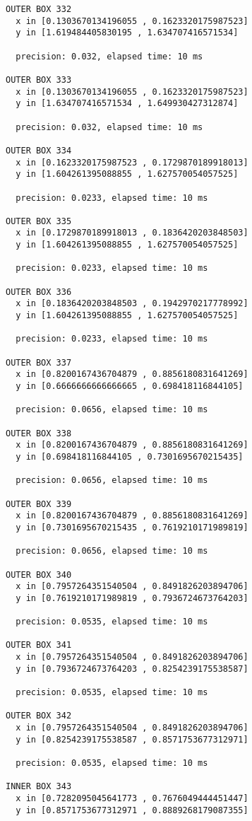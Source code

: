 \begin{verbatim}
OUTER BOX 332
  x in [0.1303670134196055 , 0.1623320175987523]
  y in [1.619484405830195 , 1.634707416571534]

  precision: 0.032, elapsed time: 10 ms

OUTER BOX 333
  x in [0.1303670134196055 , 0.1623320175987523]
  y in [1.634707416571534 , 1.649930427312874]

  precision: 0.032, elapsed time: 10 ms

OUTER BOX 334
  x in [0.1623320175987523 , 0.1729870189918013]
  y in [1.604261395088855 , 1.627570054057525]

  precision: 0.0233, elapsed time: 10 ms

OUTER BOX 335
  x in [0.1729870189918013 , 0.1836420203848503]
  y in [1.604261395088855 , 1.627570054057525]

  precision: 0.0233, elapsed time: 10 ms

OUTER BOX 336
  x in [0.1836420203848503 , 0.1942970217778992]
  y in [1.604261395088855 , 1.627570054057525]

  precision: 0.0233, elapsed time: 10 ms

OUTER BOX 337
  x in [0.8200167436704879 , 0.8856180831641269]
  y in [0.6666666666666665 , 0.698418116844105]

  precision: 0.0656, elapsed time: 10 ms

OUTER BOX 338
  x in [0.8200167436704879 , 0.8856180831641269]
  y in [0.698418116844105 , 0.7301695670215435]

  precision: 0.0656, elapsed time: 10 ms

OUTER BOX 339
  x in [0.8200167436704879 , 0.8856180831641269]
  y in [0.7301695670215435 , 0.7619210171989819]

  precision: 0.0656, elapsed time: 10 ms

OUTER BOX 340
  x in [0.7957264351540504 , 0.8491826203894706]
  y in [0.7619210171989819 , 0.7936724673764203]

  precision: 0.0535, elapsed time: 10 ms

OUTER BOX 341
  x in [0.7957264351540504 , 0.8491826203894706]
  y in [0.7936724673764203 , 0.8254239175538587]

  precision: 0.0535, elapsed time: 10 ms

OUTER BOX 342
  x in [0.7957264351540504 , 0.8491826203894706]
  y in [0.8254239175538587 , 0.8571753677312971]

  precision: 0.0535, elapsed time: 10 ms

INNER BOX 343
  x in [0.7282095045641773 , 0.7676049444451447]
  y in [0.8571753677312971 , 0.8889268179087355]


\end{verbatim}
